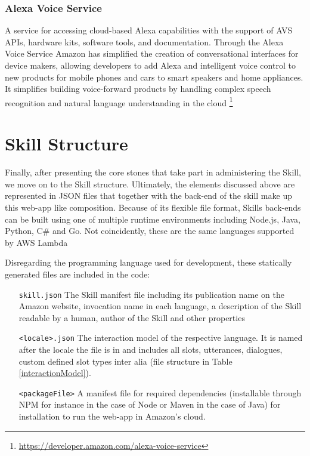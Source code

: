 		
		\subsubsection*{Alexa Voice Service} %
		 A service for accessing cloud-based Alexa capabilities with the support of AVS APIs, hardware kits, software tools, and documentation. Through the Alexa Voice Service Amazon has simplified the creation of conversational interfaces for device makers, allowing developers to add Alexa and intelligent voice control to new products for mobile phones and cars to smart speakers and home appliances.
		 It simplifies building voice-forward products by handling complex speech recognition and natural language understanding in the cloud \footnote{\url{https://developer.amazon.com/alexa-voice-service}}


	


\section{Skill Structure}


Finally, after presenting the core stones that take part in administering the Skill, we move on to the Skill structure. Ultimately, the elements discussed above are represented in JSON files that together with the back-end of the skill make up this web-app like composition. Because of its flexible file format, Skills back-ends can be built using one of multiple runtime environments including Node.js, Java, Python, C\# and Go. 
Not coincidently, these are the same languages supported by AWS Lambda %

Disregarding the programming language used for development, these statically generated files are included in the code:

\begin{itemize}

\item[\texttt{skill.json}] The Skill manifest file including its publication name on the Amazon website, invocation name in each language, a description of the Skill readable by a human, author of the Skill and other properties

\item[\texttt{<locale>.json}] The interaction model of the respective language. It is named after the locale the file is in and includes all slots, utterances, dialogues, custom defined slot types inter alia (file structure in Table \ref{interactionModel}).

\item[\texttt{<packageFile>}] A manifest file for required dependencies (installable through NPM for instance in the case of Node or Maven in the case of Java) for installation to run the web-app in Amazon's cloud.

\end{itemize}


